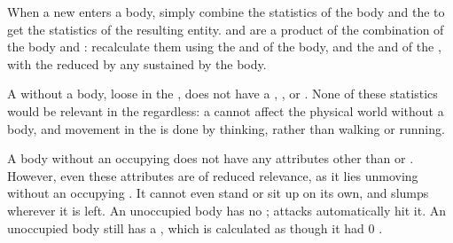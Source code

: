 When a new {\mind} enters a body, simply combine the statistics of the body and the {\mind} to get the statistics of the resulting entity.
 and  are a product of the combination of the body and {\mind}: recalculate them using the  and  of the body, and the  and  of the {\mind}, with the  reduced by any {\damage} sustained by the body.

A {\mind} without a body, loose in the {\mentalrealm}, does not have a , , or .
None of these statistics would be relevant in the {\mentalrealm} regardless: a {\mind} cannot affect the physical world without a body, and movement in the {\mentalrealm} is done by thinking, rather than walking or running.

A body without an occupying {\mind} does not have any attributes other than  or .
However, even these attributes are of reduced relevance, as it lies unmoving without an occupying {\mind}.
It cannot even stand or sit up on its own, and slumps wherever it is left.
An unoccupied body has no ; attacks automatically hit it.
An unoccupied body still has a , which is calculated as though it had 0 .

